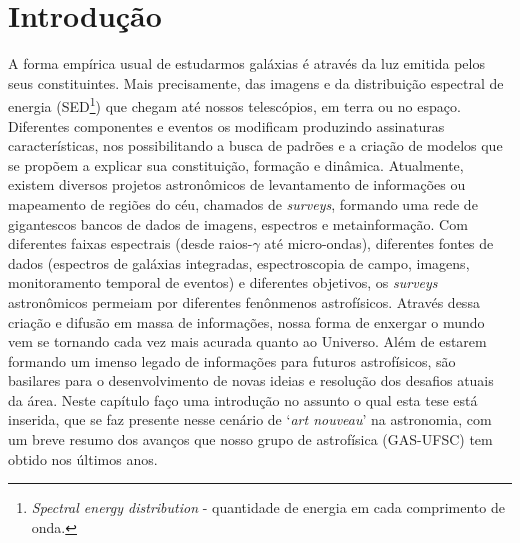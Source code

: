 


\chapter{Introdução}
\label{sec:intro}

A forma empírica usual de estudarmos galáxias é através da luz emitida pelos seus constituintes. Mais precisamente, das imagens e da distribuição espectral de energia (SED\footnote{{\em Spectral energy distribution} - quantidade de energia em cada comprimento de onda.}) que chegam até nossos telescópios, em terra ou no espaço. Diferentes componentes e eventos os modificam produzindo assinaturas características, nos possibilitando a busca de padrões e a criação de modelos que se propõem a explicar sua constituição, formação e dinâmica. Atualmente, existem diversos projetos astronômicos de levantamento de informações ou mapeamento de regiões do céu, chamados de {\em surveys}, formando uma rede de gigantescos bancos de dados de imagens, espectros e metainformação. Com diferentes faixas espectrais (desde raios-$\gamma$ até micro-ondas), diferentes fontes de dados (espectros de galáxias integradas, espectroscopia de campo, imagens, monitoramento temporal de eventos) e diferentes objetivos, os {\em surveys} astronômicos permeiam por diferentes fenônmenos astrofísicos. Através dessa criação e difusão em massa de informações, nossa forma de enxergar o mundo vem se tornando cada vez mais acurada quanto ao Universo. Além de estarem formando um imenso legado de informações para futuros astrofísicos, são basilares para o desenvolvimento de novas ideias e resolução dos desafios atuais da área. Neste capítulo faço uma introdução no assunto o qual esta tese está inserida, que se faz presente nesse cenário de `{\em art nouveau}' na astronomia, com um breve resumo dos avanços que nosso grupo de astrofísica (GAS-UFSC) tem obtido nos últimos anos.


